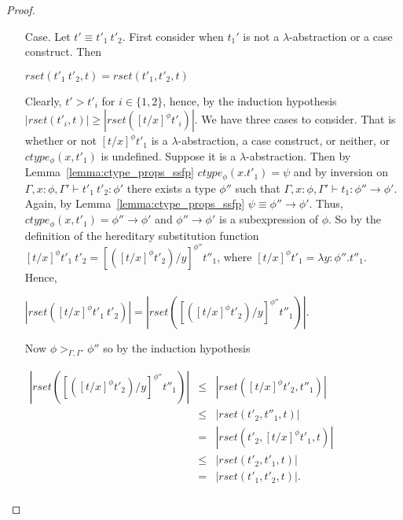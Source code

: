 \begin{proof}
\begin{itemize}
\item[Case.] Let $t' \equiv t'_1\ t'_2$.  First consider when $t_1'$ is not a $\lambda$-abstraction or a case construct. Then
  \begin{center}
    $rset(t'_1\ t'_2, t) = rset(t'_1, t'_2, t)$
  \end{center}  
  Clearly,  $t' > t'_i$ for $i \in \{1,2\}$, hence, by the induction hypothesis $|rset(t'_i,t)| \geq |rset([t/x]^\phi t'_i)|$.  
  We have three cases to consider.  That is whether or not $[t/x]^\phi t'_1$ is a $\lambda$-abstraction, 
  a case construct, or neither, or $ctype_\phi(x,t'_1)$ is undefined.  
  Suppose it is a $\lambda$-abstraction.
  Then by Lemma~\ref{lemma:ctype_props_ssfp} $ctype_\phi(x.t'_1) = \psi$ and by inversion on $\Gamma,x:\phi,\Gamma' \vdash t'_1\ t'_2:\phi'$
  there exists a type $\phi''$ such that $\Gamma,x:\phi,\Gamma' \vdash t_1:\phi'' \to \phi'$.  Again, by Lemma~\ref{lemma:ctype_props_ssfp}
  $\psi \equiv \phi'' \to \phi'$. Thus, $ctype_\phi(x,t'_1) = \phi'' \to \phi'$ and $\phi'' \to \phi'$ is a subexpression of $\phi$.
  So by the definition of the hereditary substitution function $[t/x]^\phi t'_1\ t'_2 = [([t/x]^\phi t'_2)/y]^{\phi''} t''_1$, where
  $[t/x]^\phi t'_1 = \lambda y:\phi''.t''_1$.  Hence,
  \begin{center}
    \begin{math}
      |rset([t/x]^\phi t'_1\ t'_2)| = |rset([([t/x]^\phi t'_2)/y]^{\phi''} t''_1)|.
    \end{math}
  \end{center}
  Now $\phi >_{\Gamma,\Gamma'} \phi''$ so by the induction hypothesis 
  \begin{center}
    \begin{math}
      \begin{array}{lll}
        |rset([([t/x]^\phi t'_2)/y]^{\phi''} t''_1)| & \leq & |rset([t/x]^\phi t'_2, t''_1)|\\
        & \leq & |rset(t'_2, t''_1, t)|\\
        & = & |rset(t'_2, [t/x]^\phi t'_1, t)|\\
        & \leq & |rset(t'_2, t'_1, t)|\\
        & = & |rset(t'_1, t'_2, t)|.\\
      \end{array}
    \end{math}
  \end{center}
  

\end{itemize}
\end{proof}
